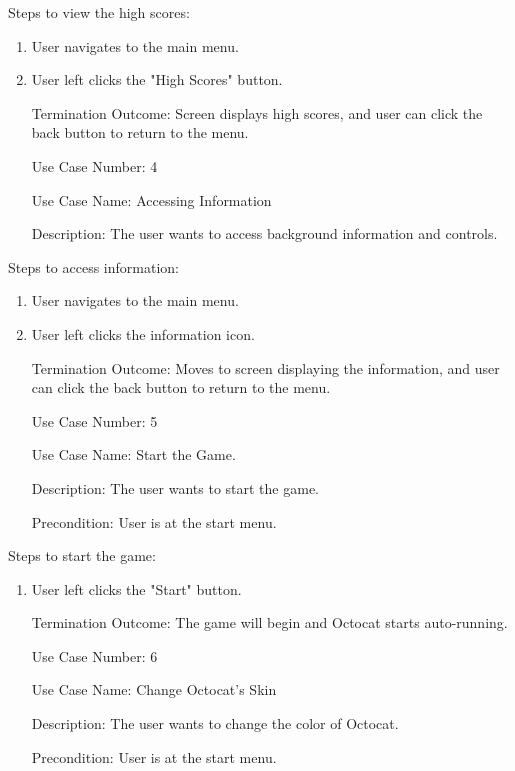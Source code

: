 \documentclass[10pt,conference,onecolumn,compsoc]{IEEEtran}
\begin{document}
Steps to view the high scores:

\begin{enumerate}
\item User navigates to the main menu.
\item User left clicks the "High Scores" button.
\item[Termination Outcome:] Screen displays high scores, and user can click the back button to return to the menu.\\
\end{enumerate}

\begin{itemize}
\item[Use Case Number:] 4
\item[Use Case Name:] Accessing Information
\item[Description:] The user wants to access background information and controls.
\end{itemize}

Steps to access information:

\begin{enumerate}
\item User navigates to the main menu.
\item User left clicks the information icon.
\item[Termination Outcome:] Moves to screen displaying the information, and user can click the back button to return to the menu.\\
\end{enumerate}

\begin{itemize}
\item[Use Case Number:] 5
\item[Use Case Name:] Start the Game.
\item[Description:] The user wants to start the game.
\item[Precondition:] User is at the start menu.
\end{itemize}

Steps to start the game:

\begin{enumerate}
\item User left clicks the "Start" button.
\item[Termination Outcome:] The game will begin and Octocat starts auto-running.\\
\end{enumerate}

\begin{itemize}
\item[Use Case Number:] 6
\item[Use Case Name:] Change Octocat's Skin
\item[Description:] The user wants to change the color of Octocat.
\item[Precondition:] User is at the start menu.
\end{itemize}
\end{document}
